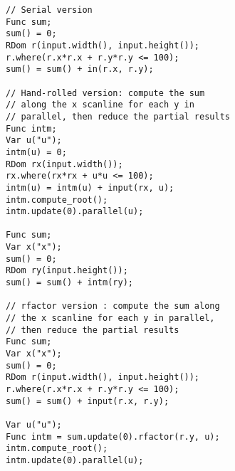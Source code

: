 \begin{lstlisting}[caption={Summation over a circular reduction domain with radius of 10: serial vs. parallel hand-rolled vs. parallel rfactor}, label={lst:circular_sum}]
// Serial version
Func sum;
sum() = 0;
RDom r(input.width(), input.height());
r.where(r.x*r.x + r.y*r.y <= 100);
sum() = sum() + in(r.x, r.y);

// Hand-rolled version: compute the sum 
// along the x scanline for each y in 
// parallel, then reduce the partial results
Func intm;
Var u("u");
intm(u) = 0;
RDom rx(input.width());
rx.where(rx*rx + u*u <= 100);
intm(u) = intm(u) + input(rx, u);
intm.compute_root();
intm.update(0).parallel(u);

Func sum;
Var x("x");
sum() = 0;
RDom ry(input.height());
sum() = sum() + intm(ry);

// rfactor version : compute the sum along
// the x scanline for each y in parallel, 
// then reduce the partial results
Func sum;
Var x("x");
sum() = 0;
RDom r(input.width(), input.height());
r.where(r.x*r.x + r.y*r.y <= 100);
sum() = sum() + input(r.x, r.y);

Var u("u");
Func intm = sum.update(0).rfactor(r.y, u);
intm.compute_root();
intm.update(0).parallel(u);
\end{lstlisting}
